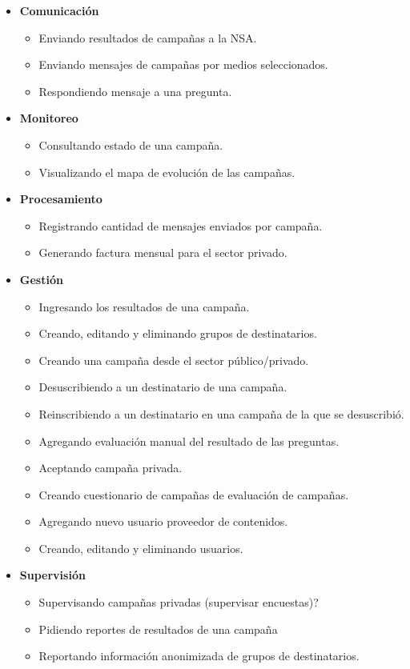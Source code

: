 \documentclass[a4paper, 10pt, twoside]{article}
\begin{document}
\begin{itemize}

\item \textbf{Comunicación}
\begin{itemize}
\item Enviando resultados de campañas a la NSA.
\item Enviando mensajes de campañas por medios seleccionados.
\item Respondiendo mensaje a una pregunta.
\end{itemize}

\item \textbf{Monitoreo}
\begin{itemize}
\item Consultando estado de una campaña.
\item Visualizando el mapa de evolución de las campañas.
\end{itemize}

\item \textbf{Procesamiento}
\begin{itemize}
\item Registrando cantidad de mensajes enviados por campaña.
\item Generando factura mensual para el sector privado.
\end{itemize}

\item \textbf{Gestión}
\begin{itemize}
\item Ingresando los resultados de una campaña.
\item Creando, editando y eliminando grupos de destinatarios.
\item Creando una campaña desde el sector público/privado.
\item Desuscribiendo a un destinatario de una campaña.
\item Reinscribiendo a un destinatario en una campaña de la que se desuscribió.
\item Agregando evaluación manual del resultado de las preguntas.
\item Aceptando campaña privada.
\item Creando cuestionario de campañas de evaluación de campañas.
\item Agregando nuevo usuario proveedor de contenidos.
\item Creando, editando y eliminando usuarios.
\end{itemize}

\item \textbf{Supervisión}
\begin{itemize}
\item Supervisando campañas privadas (supervisar encuestas)?
\item Pidiendo reportes de resultados de una campaña
\item Reportando información anonimizada de grupos de destinatarios.
\end{itemize}


\end{itemize}
\end{document}
